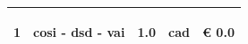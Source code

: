 \documentclass[a4paper]{article}
\begin{document}
\begin{tabular}{ | L{10mm} |  L{86mm} | L{12mm} | L{12mm} | L{16mm} | }
                                     \vspace{2.5mm}
                                     \begin{spacing}{0}
                                  1
                                     \end{spacing} &
                                     \vspace{2.5mm}
                                     \begin{spacing}{0}
                                  cosi - dsd - \newline vai
                                     \end{spacing} &
                                     \vspace{2.5mm}
                                     \begin{spacing}{0}
                                  1.0
                                     \end{spacing} &
                                     \vspace{2.5mm}
                                     \begin{spacing}{0}
                                  cad
                                     \end{spacing} &
                                     \vspace{2.5mm}
                                     \begin{spacing}{0}
                                       \euro\hfill 
                                   0.0
                                     \end{spacing} \\
                                     \hline
    

\end{tabular}
\end{document}
